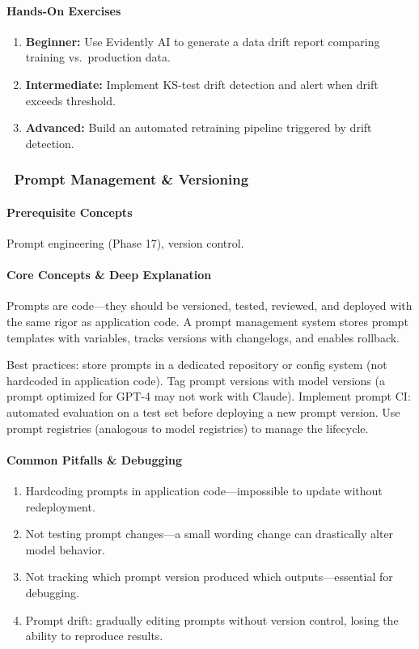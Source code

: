 \documentclass[11pt, a4paper, oneside]{report}
\newcommand{\mustmaster}[1]{\subsubsection{\texorpdfstring{\fcolorbox{blue!40!black}{blue!8}{\footnotesize\bfseries\color{blue!40!black} MUST MASTER}~#1}{#1}}}
\begin{document}
\paragraph{Hands-On Exercises}
\begin{enumerate}[leftmargin=*]
\item \textbf{Beginner:} Use Evidently AI to generate a data drift report comparing training vs.\ production data.
\item \textbf{Intermediate:} Implement KS-test drift detection and alert when drift exceeds threshold.
\item \textbf{Advanced:} Build an automated retraining pipeline triggered by drift detection.
\end{enumerate}

\mustmaster{Prompt Management \& Versioning}

\paragraph{Prerequisite Concepts} Prompt engineering (Phase 17), version control.

\paragraph{Core Concepts \& Deep Explanation} Prompts are code---they should be versioned, tested, reviewed, and deployed with the same rigor as application code. A prompt management system stores prompt templates with variables, tracks versions with changelogs, and enables rollback.

Best practices: store prompts in a dedicated repository or config system (not hardcoded in application code). Tag prompt versions with model versions (a prompt optimized for GPT-4 may not work with Claude). Implement prompt CI: automated evaluation on a test set before deploying a new prompt version. Use prompt registries (analogous to model registries) to manage the lifecycle.

\paragraph{Common Pitfalls \& Debugging}
\begin{enumerate}[leftmargin=*]
\item Hardcoding prompts in application code---impossible to update without redeployment.
\item Not testing prompt changes---a small wording change can drastically alter model behavior.
\item Not tracking which prompt version produced which outputs---essential for debugging.
\item Prompt drift: gradually editing prompts without version control, losing the ability to reproduce results.
\end{enumerate}
\end{document}
